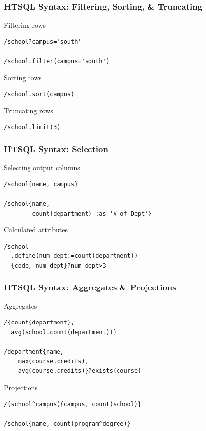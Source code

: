 \documentclass{beamer}
\begin{document}
\begin{frame}[containsverbatim]
\frametitle{HTSQL Syntax: Filtering, Sorting, \& Truncating}
\begin{block}{Filtering rows}
\begin{lstlisting}
/school?campus='south'

/school.filter(campus='south')
\end{lstlisting}
\end{block}
\begin{block}{Sorting rows}
\begin{lstlisting}
/school.sort(campus)
\end{lstlisting}
\end{block}
\begin{block}{Truncating rows}
\begin{lstlisting}
/school.limit(3)
\end{lstlisting}
\end{block}
\end{frame}

\begin{frame}[containsverbatim]
\frametitle{HTSQL Syntax: Selection}
\begin{block}{Selecting output columns}
\begin{lstlisting}
/school{name, campus}

/school{name,
        count(department) :as '# of Dept'}
\end{lstlisting}
\end{block}
\begin{block}{Calculated attributes}
\begin{lstlisting}
/school
  .define(num_dept:=count(department))
  {code, num_dept}?num_dept>3
\end{lstlisting}
\end{block}
\end{frame}

\begin{frame}[containsverbatim]
\frametitle{HTSQL Syntax: Aggregates \& Projections}
\begin{block}{Aggregates}
\begin{lstlisting}
/{count(department),
  avg(school.count(department))}

/department{name,
    max(course.credits),
    avg(course.credits)}?exists(course)
\end{lstlisting}
\end{block}
\begin{block}{Projections}
\begin{lstlisting}
/(school^campus){campus, count(school)}

/school{name, count(program^degree)}
\end{lstlisting}
\end{block}
\end{frame}
\end{document}
